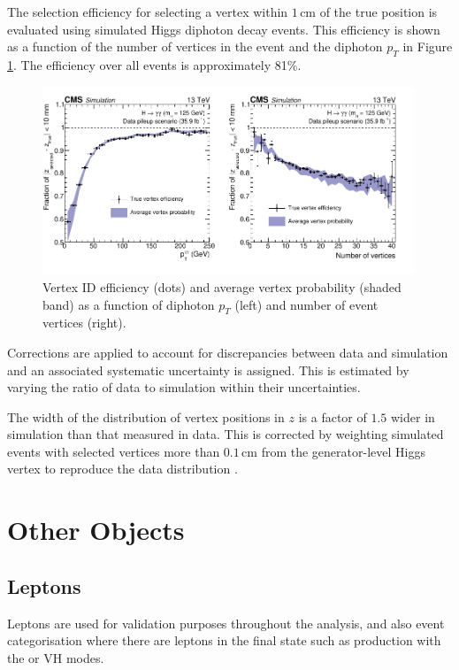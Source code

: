The selection efficiency for selecting a vertex within $1$\,cm of the true position is evaluated using simulated Higgs diphoton decay events. This efficiency is shown as a function of the number of vertices in the event and the diphoton $p_{T}$ in Figure \ref{fig:object_reco:vertex_id_efficiency}. The efficiency over all events is approximately 81\%.
\begin{figure}[h!]
    \centering
    \includegraphics[width=0.99\textwidth]{figures/object_reco/CMS-HIG-16-040_Figure_004.pdf}
    \caption{Vertex ID efficiency (dots) and average vertex probability (shaded band) as a function of diphoton $p_T$ (left) and number of event vertices (right).}
        \label{fig:object_reco:vertex_id_efficiency}
\end{figure}

Corrections are applied to account for discrepancies between data and simulation and an associated systematic uncertainty is assigned. This is estimated by varying the ratio of data to simulation within their uncertainties. 

The width of the distribution of vertex positions in $z$ is a factor of $1.5$ wider in simulation than that measured in data. 
This is corrected by weighting simulated events with selected vertices more than $0.1$\,cm from the generator-level Higgs vertex to reproduce the data distribution \cite{HIG-16-040}.




\section{Other Objects}

\subsection{Leptons}
Leptons are used for validation purposes throughout the analysis, and also event categorisation where there are leptons in the final state such as production with the \ttH or VH modes. 
